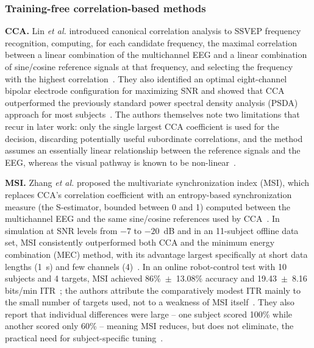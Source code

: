 \documentclass[11pt]{article}
\begin{document}
\subsubsection{Training-free correlation-based methods}

\textbf{CCA.} Lin \textit{et al.} introduced canonical correlation analysis to SSVEP frequency recognition, computing, for each candidate frequency, the maximal correlation between a linear combination of the multichannel EEG and a linear combination of sine/cosine reference signals at that frequency, and selecting the frequency with the highest correlation~\cite{lin2007cca}. They also identified an optimal eight-channel bipolar electrode configuration for maximizing SNR and showed that CCA outperformed the previously standard power spectral density analysis (PSDA) approach for most subjects~\cite{lin2007cca}. The authors themselves note two limitations that recur in later work: only the single largest CCA coefficient is used for the decision, discarding potentially useful subordinate correlations, and the method assumes an essentially linear relationship between the reference signals and the EEG, whereas the visual pathway is known to be non-linear~\cite{lin2007cca}.

\textbf{MSI.} Zhang \textit{et al.} proposed the multivariate synchronization index (MSI), which replaces CCA's correlation coefficient with an entropy-based synchronization measure (the S-estimator, bounded between 0 and 1) computed between the multichannel EEG and the same sine/cosine references used by CCA~\cite{zhang2014msi}. In simulation at SNR levels from $-7$ to $-20$~dB and in an 11-subject offline data set, MSI consistently outperformed both CCA and the minimum energy combination (MEC) method, with its advantage largest specifically at short data lengths (1~s) and few channels (4)~\cite{zhang2014msi}. In an online robot-control test with 10 subjects and 4 targets, MSI achieved 86\%~$\pm$~13.08\% accuracy and 19.43~$\pm$~8.16 bits/min ITR~\cite{zhang2014msi}; the authors attribute the comparatively modest ITR mainly to the small number of targets used, not to a weakness of MSI itself~\cite{zhang2014msi}. They also report that individual differences were large -- one subject scored 100\% while another scored only 60\% -- meaning MSI reduces, but does not eliminate, the practical need for subject-specific tuning~\cite{zhang2014msi}.
\end{document}
